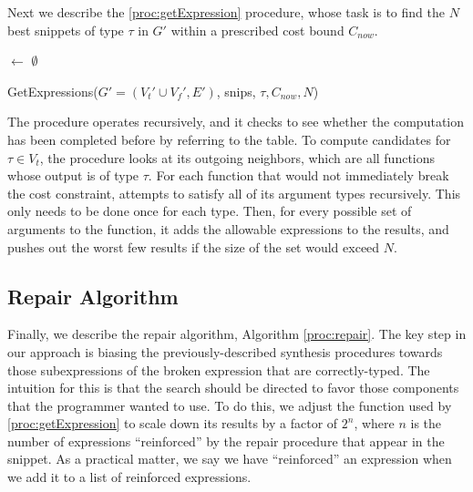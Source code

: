 Next we describe the \ref{proc:getExpression} procedure, whose task is
to find the $N$ best snippets of type $\tau$ in $G'$ within a
prescribed cost bound $C_{now}$.
\begin{procedure}[htb]
\lIf{$\tau$ $\in$ \Keys{\Snips}}{\Return{\Snips$[\tau]$}}
\Results $\leftarrow$ $\emptyset$ \;
\Return{\Results}
\caption{GetExpressions({$G'=(V_t' \cup V_f', E')$}, snips, $\tau, C_{now}, N$)}\label{proc:getExpression}
\end{procedure}
The procedure operates recursively, and it checks to see whether the
computation has been completed before by referring to the \Snips
table. To compute candidates for $\tau \in V_t$, the procedure looks
at its outgoing neighbors, which are all functions whose output is of type $\tau$.
For each function that would not immediately break the cost constraint,
\label{proc:getExpression} attempts to satisfy all of its argument types recursively.
This only needs to be done once for each type. Then, for every possible
set of arguments to the function, it adds the allowable expressions to the
results, and pushes out the worst few results if the size of the set would
exceed $N$.

\subsection{Repair Algorithm}
\label{sec:algorithm:repair}
Finally, we describe the repair algorithm, Algorithm \ref{proc:repair}. The key step in our
approach is biasing the previously-described synthesis procedures
towards those subexpressions of the broken expression that are
correctly-typed. The intuition for this is that the search should be
directed to favor those components that the programmer wanted to use.
To do this, we adjust the \Cost function used by \ref{proc:getExpression} to 
scale down its results by a factor of $2^n$, where $n$ is the number of
expressions ``reinforced'' by the repair procedure that appear in the
snippet. As a practical matter, we say we have ``reinforced'' an
expression when we add it to a list of reinforced expressions.

